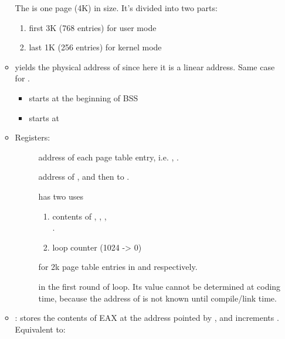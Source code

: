 \begin{itemize}
\begin{itemize}
      The  is one page (4K) in size. It's divided into two parts:
      \begin{enumerate}
      \item first 3K (768 entries) for user mode
      \item last 1K (256 entries) for kernel mode
      \end{enumerate}
    \item {} yields the physical address of 
      since here it is a linear address. Same case for .
      \begin{itemize}
      \item {} starts at the beginning of BSS
      \item {} starts at 
      \end{itemize}
    \item Registers:
      \begin{description}
      \item[] address of each page table entry, i.e. ,
        .
      \item[] address of , and then to
        .
      \item[] has two uses
        \begin{enumerate}
        \item contents of , ,
          ,\\ .
        \item loop counter (1024 -> 0)
        \end{enumerate}
      \item[]  for 2k page table entries in
         and  respectively.
      \item[]  in the first round of loop. Its
        value cannot be determined at coding time, because the address of  is
        not known until compile/link time.
      \end{description}
    \item {}: stores the contents of EAX at the address pointed by ,
      and increments . Equivalent to:
      \begin{enumerate}

\end{enumerate}
\end{itemize}
\end{itemize}
